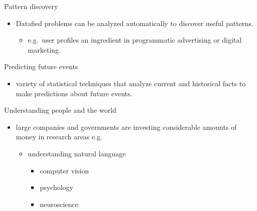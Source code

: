 \begin{frame}{Pattern discovery}
\protect\hypertarget{pattern-discovery}{}
\begin{itemize}
\tightlist
\item
  Datafied problems can be analyzed automatically to discover useful
  patterns.

  \begin{itemize}
  \tightlist
  \item
    e.g.~user profiles an ingredient in programmatic advertising or
    digital marketing.
  \end{itemize}
\end{itemize}
\end{frame}

\begin{frame}{Predicting future events}
\protect\hypertarget{predicting-future-events}{}
\begin{itemize}
\tightlist
\item
  variety of statistical techniques that analyze current and historical
  facts to make predictions about future events.
\end{itemize}
\end{frame}

\begin{frame}{Understanding people and the world}
\protect\hypertarget{understanding-people-and-the-world}{}
\begin{itemize}
\tightlist
\item
  large companies and governments are investing considerable amounts of
  money in research areas e.g.

  \begin{itemize}
  \tightlist
  \item
    understanding natural language

    \begin{itemize}
    \tightlist
    \item
      computer vision
    \item
      psychology
    \item
      neuroscience
    \end{itemize}
  \end{itemize}
\end{itemize}
\end{frame}
